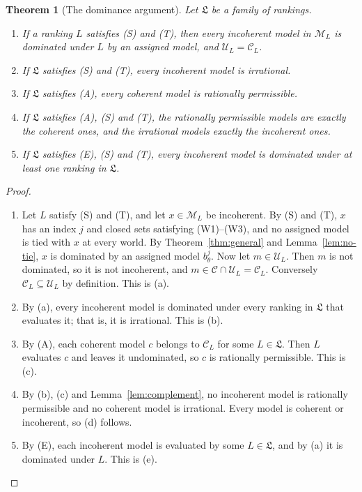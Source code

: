 \documentclass[11pt]{article}
\newtheorem{theorem}{Theorem}[section]
\theoremstyle{definition}
\theoremstyle{remark}
\newcommand{\M}{\mathcal M}
\newcommand{\C}{\mathcal C}
\newcommand{\U}{\mathcal U}
\newcommand{\Lf}{\mathfrak L}
\begin{document}
\begin{theorem}[The dominance argument]\label{thm:argument}
Let $\Lf$ be a family of rankings.
\begin{enumerate}[label=(\alph*)]
\item If a ranking $L$ satisfies {\color{red}(S)} and {\color{red}(T)}, then every incoherent model in $\M_L$ is dominated under $L$ by an assigned model, and $\U_L=\C_L$.
\item If $\Lf$ satisfies {\color{red}(S)} and {\color{red}(T)}, every incoherent model is irrational.
\item If $\Lf$ satisfies (A), every coherent model is rationally permissible.
\item If $\Lf$ satisfies (A), {\color{red}(S)} and {\color{red}(T)}, the rationally permissible models are exactly the coherent ones, and the irrational models exactly the incoherent ones.
\item If $\Lf$ satisfies (E), {\color{red}(S)} and {\color{red}(T)}, every incoherent model is dominated under at least one ranking in $\Lf$.
\end{enumerate}
\end{theorem}
\begin{proof}
\leavevmode
\begin{enumerate}[label=\arabic*.,leftmargin=*]
\item Let $L$ satisfy {\color{red}(S)} and {\color{red}(T)}, and let $x\in\M_L$ be incoherent. {\color{red}By (S) and (T), $x$ has an index $j$ and closed sets satisfying (W1)--(W3), and no assigned model is tied with $x$ at every world. By Theorem~\ref{thm:general} and Lemma~\ref{lem:no-tie}, $x$ is dominated by an assigned model $b^j_\theta$.} Now let $m\in\U_L$. Then $m$ is not dominated, so it is not incoherent, and $m\in\C\cap\U_L=\C_L$. Conversely $\C_L\subseteq\U_L$ by definition. This is (a).
\item By (a), every incoherent model is dominated under every ranking in $\Lf$ that evaluates it; that is, it is irrational. This is (b).
\item By (A), each coherent model $c$ belongs to $\C_L$ for some $L\in\Lf$. Then $L$ evaluates $c$ and leaves it undominated, so $c$ is rationally permissible. This is (c).
\item By (b), (c) and Lemma~\ref{lem:complement}, no incoherent model is rationally permissible and no coherent model is irrational. Every model is coherent or incoherent, so (d) follows.
\item By (E), each incoherent model is evaluated by some $L\in\Lf$, and by (a) it is dominated under $L$. This is (e).\qedhere
\end{enumerate}
\end{proof}
\end{document}
